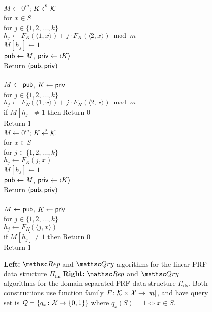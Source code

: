 \begin{figure}[tp]
\centering
{}
{
\\
$M \gets 0^m$; $K {\:\stackrel{{\scriptscriptstyle \hspace{0.2em}\$}} {\leftarrow}\:} {\cal K}$\\
for $x \in S$\\
\nudge for $j \in \{1,2,\ldots,k\}$\\
\nudge\nudge $h_j \gets F_{K}(\langle 1,x \rangle) + j\cdot F_{K}(\langle 2,x \rangle) \bmod m$\\
\nudge\nudge $M[h_j] \gets 1$\\
${\sf pub} \gets M$, ${\sf priv} \gets \langle K \rangle$\\
Return $({\sf pub},{\sf priv})$\\

\medskip
{}\\
$M\gets{\sf pub}$, $K \gets {\sf priv}$\\
for $j \in \{1,2,\ldots,k\}$\\
\nudge $h_j \gets F_{K}(\langle 1,x \rangle) + j\cdot F_{K}(\langle 2,x\rangle) \bmod m$\\
\nudge if $M[h_j] \neq 1$ then Return 0\\
Return 1
}
{
\\
$M \gets 0^m$; $K {\:\stackrel{{\scriptscriptstyle \hspace{0.2em}\$}} {\leftarrow}\:} {\cal K}$\\
for $x \in S$\\
\nudge for $j \in \{1,2,\ldots,k\}$\\
\nudge\nudge $h_j \gets F_{K}(j,x) $\\
\nudge\nudge $M[h_j] \gets 1$\\
${\sf pub} \gets M$, ${\sf priv} \gets \langle K \rangle$\\
Return $({\sf pub},{\sf priv})$\\

\medskip
{}\\
$M\gets{\sf pub}$, $K \gets {\sf priv}$\\
for $j \in \{1,2,\ldots,k\}$\\
\nudge $h_j \gets F_{K}(\langle j,x \rangle) $\\
\nudge if $M[h_j] \neq 1$ then Return 0\\
Return 1
}
\caption{{\bf Left:} $\Rep$ and $\Qry$ algorithms for the linear-PRF
  data structure $\Pi_{\mathrm{lin}}$ {\bf Right:} $\Rep$ and $\Qry$
  algorithms for the domain-separated PRF data structure
  $\Pi_{\mathrm{ds}}$.  Both constructions use function family $F \colon
  {\cal K} \times {\cal X} \to [m]$, and have query set is ${\cal Q}=\{q_x\colon
  {\cal X} \to \{0,1\}\}$ where $q_x(S)=1 \Leftrightarrow x \in S$.  }
\label{fig:lin-and-ds}
\end{figure}

